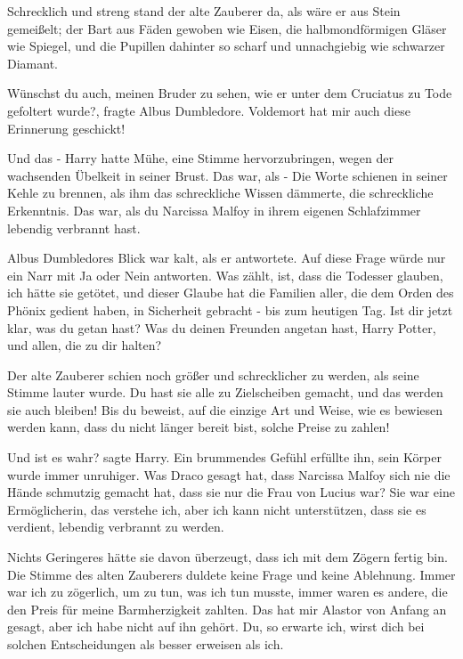 Schrecklich und streng stand der alte Zauberer da, als wäre er aus Stein
gemeißelt; der Bart aus Fäden gewoben wie Eisen, die halbmondförmigen Gläser wie
Spiegel, und die Pupillen dahinter so scharf und unnachgiebig wie schwarzer
Diamant.

\glqq{}Wünschst du auch, meinen Bruder zu sehen, wie er unter dem Cruciatus zu
Tode gefoltert wurde?\grqq{}, fragte Albus Dumbledore. \glqq{}Voldemort hat mir
auch diese Erinnerung geschickt!\grqq{}

\glqq{}Und das -\grqq{} Harry hatte Mühe, eine Stimme hervorzubringen, wegen der
wachsenden Übelkeit in seiner Brust. \glqq{}Das war, als -\grqq{} Die Worte
schienen in seiner Kehle zu brennen, als ihm das schreckliche Wissen dämmerte,
die schreckliche Erkenntnis. \glqq{}Das war, als du Narcissa Malfoy in ihrem
eigenen Schlafzimmer lebendig verbrannt hast.\grqq{}

Albus Dumbledores Blick war kalt, als er antwortete. \glqq{}Auf diese Frage würde
nur ein Narr mit Ja oder Nein antworten. Was zählt, ist, dass die Todesser
glauben, ich hätte sie getötet, und dieser Glaube hat die Familien aller, die
dem Orden des Phönix gedient haben, in Sicherheit gebracht - bis zum heutigen
Tag. Ist dir jetzt klar, was du getan hast? Was du deinen Freunden angetan hast,
Harry Potter, und allen, die zu dir halten?\grqq{}

Der alte Zauberer schien noch größer und schrecklicher zu werden, als seine
Stimme lauter wurde. \glqq{}Du hast sie alle zu Zielscheiben gemacht, und das
werden sie auch bleiben! Bis du beweist, auf die einzige Art und Weise, wie es
bewiesen werden kann, dass du nicht länger bereit bist, solche Preise zu
zahlen!\grqq{}

\glqq{}Und ist es wahr?\grqq{} sagte Harry. Ein brummendes Gefühl erfüllte ihn,
sein Körper wurde immer unruhiger. \glqq{}Was Draco gesagt hat, dass Narcissa
Malfoy sich nie die Hände schmutzig gemacht hat, dass sie nur die Frau von
Lucius war? Sie war eine Ermöglicherin, das verstehe ich, aber ich kann nicht
unterstützen, dass sie es verdient, lebendig verbrannt zu werden.\grqq{}

\glqq{}Nichts Geringeres hätte sie davon überzeugt, dass ich mit dem Zögern
fertig bin.\grqq{} Die Stimme des alten Zauberers duldete keine Frage und keine
Ablehnung. \glqq{}Immer war ich zu zögerlich, um zu tun, was ich tun musste,
immer waren es andere, die den Preis für meine Barmherzigkeit zahlten. Das hat
mir Alastor von Anfang an gesagt, aber ich habe nicht auf ihn gehört. Du, so
erwarte ich, wirst dich bei solchen Entscheidungen als besser erweisen als
ich.\grqq{}

